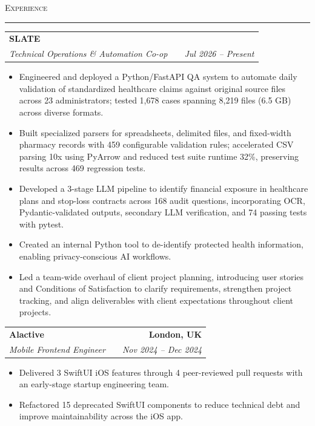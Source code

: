 \documentclass[letterpaper,10pt]{article}
\makeatletter
\newcommand{\header}[1]{\par\vspace{6pt}\textsc{#1}\par\nobreak\vspace{1pt}\hrule\vspace{4pt}}
\newcommand{\role}[4]{%
  \begin{tabularx}{\textwidth}{@{}lXr@{}}
    \textbf{#1} & & \textbf{#2} \\
    \textit{#3} & & \textit{#4} \\
  \end{tabularx}\vspace{-3pt}%
}
\makeatother
\begin{document}
\header{Experience}
\role{SLATE}{}{Technical Operations \& Automation Co-op}{Jul 2026 -- Present}
\begin{itemize}
  \item Engineered and deployed a Python/FastAPI QA system to automate daily validation of standardized healthcare claims against original source files across 23 administrators; tested 1,678 cases spanning 8,219 files (6.5 GB) across diverse formats.
  \item Built specialized parsers for spreadsheets, delimited files, and fixed-width pharmacy records with 459 configurable validation rules; accelerated CSV parsing 10x using PyArrow and reduced test suite runtime 32\%, preserving results across 469 regression tests.
  \item Developed a 3-stage LLM pipeline to identify financial exposure in healthcare plans and stop-loss contracts across 168 audit questions, incorporating OCR, Pydantic-validated outputs, secondary LLM verification, and 74 passing tests with pytest.
  \item Created an internal Python tool to de-identify protected health information, enabling privacy-conscious AI workflows.
  \item Led a team-wide overhaul of client project planning, introducing user stories and Conditions of Satisfaction to clarify requirements, strengthen project tracking, and align deliverables with client expectations throughout client projects.
\end{itemize}
\vspace{2pt}
\role{Alactive}{London, UK}{Mobile Frontend Engineer}{Nov 2024 -- Dec 2024}
\begin{itemize}
  \item Delivered 3 SwiftUI iOS features through 4 peer-reviewed pull requests with an early-stage startup engineering team.
  \item Refactored 15 deprecated SwiftUI components to reduce technical debt and improve maintainability across the iOS app.
\end{itemize}
\end{document}
